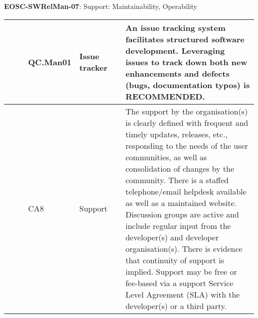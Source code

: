 \textbf{EOSC-SWRelMan-07}: Support: Maintainability, Operability
\nopagebreak[4]
\begin{center}
    \tabletail{\hline}
    \tiny
    \begin{supertabular}{|p{0.10\linewidth}|p{0.10\linewidth}|p{0.20\linewidth}|p{0.60\linewidth}|} \hline
        \cite{orviz_set_2017} & QC.Man01 & Issue tracker & An issue tracking system facilitates structured software development. Leveraging issues to track down both new enhancements and defects (bugs, documentation typos) is RECOMMENDED.\\ \hline
        \cite{shepherdson_cessda_2019} & CA8 & Support & The support by the organisation(s) is clearly defined with frequent and timely updates, releases, etc., responding to the needs of the user communities, as well as consolidation of changes by the community. There is a staffed telephone/email helpdesk available as well as a maintained website. Discussion groups are active and include regular input from the developer(s) and developer organisation(s). There is evidence that continuity of support is implied. Support may be free or fee-based via a support Service Level Agreement (SLA) with the developer(s) or a third party.\\ \hline
    \end{supertabular}
\end{center}

